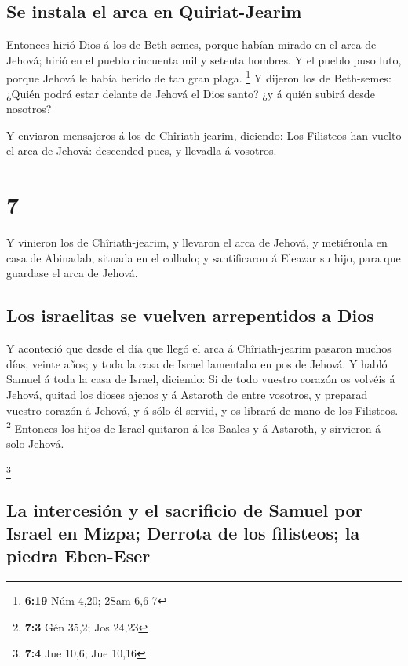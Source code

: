 \hypertarget{se-instala-el-arca-en-quiriat-jearim}{%
\subsection{Se instala el arca en
Quiriat-Jearim}\label{se-instala-el-arca-en-quiriat-jearim}}

 Entonces hirió Dios á los de Beth-semes, porque habían
mirado en el arca de Jehová; hirió en el pueblo cincuenta mil y setenta
hombres. Y el pueblo puso luto, porque Jehová le había herido de tan
gran plaga. \footnote{\textbf{6:19} Núm 4,20; 2Sam 6,6-7} 
Y dijeron los de Beth-semes: ¿Quién podrá estar delante de Jehová el
Dios santo? ¿y á quién subirá desde nosotros?

 Y enviaron mensajeros á los de Chîriath-jearim, diciendo:
Los Filisteos han vuelto el arca de Jehová: descended pues, y llevadla á
vosotros.

\hypertarget{section-6}{%
\section{7}\label{section-6}}

 Y vinieron los de Chîriath-jearim, y llevaron el arca de
Jehová, y metiéronla en casa de Abinadab, situada en el collado; y
santificaron á Eleazar su hijo, para que guardase el arca de Jehová.

\hypertarget{los-israelitas-se-vuelven-arrepentidos-a-dios}{%
\subsection{Los israelitas se vuelven arrepentidos a
Dios}\label{los-israelitas-se-vuelven-arrepentidos-a-dios}}

 Y aconteció que desde el día que llegó el arca á
Chîriath-jearim pasaron muchos días, veinte años; y toda la casa de
Israel lamentaba en pos de Jehová.  Y habló Samuel á toda la
casa de Israel, diciendo: Si de todo vuestro corazón os volvéis á
Jehová, quitad los dioses ajenos y á Astaroth de entre vosotros, y
preparad vuestro corazón á Jehová, y á sólo él servid, y os librará de
mano de los Filisteos. \footnote{\textbf{7:3} Gén 35,2; Jos 24,23}
 Entonces los hijos de Israel quitaron á los Baales y á
Astaroth, y sirvieron á solo Jehová.

\footnote{\textbf{7:4} Jue 10,6; Jue 10,16}

\hypertarget{la-intercesiuxf3n-y-el-sacrificio-de-samuel-por-israel-en-mizpa-derrota-de-los-filisteos-la-piedra-eben-eser}{%
\subsection{La intercesión y el sacrificio de Samuel por Israel en
Mizpa; Derrota de los filisteos; la piedra
Eben-Eser}\label{la-intercesiuxf3n-y-el-sacrificio-de-samuel-por-israel-en-mizpa-derrota-de-los-filisteos-la-piedra-eben-eser}}

